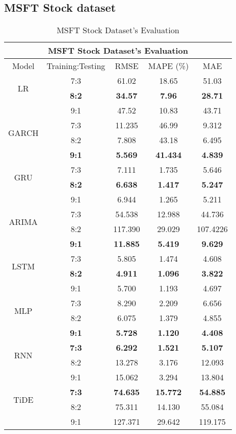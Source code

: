 \documentclass{ieeeojies}
\begin{document}
\subsection{MSFT Stock dataset} 
\begin{table}[H]
    \centering
    \begin{tabular}{|c|c|c|c|c|}
         \hline
         \multicolumn{5}{|c|}{\textbf{MSFT Stock Dataset's Evaluation}}\\
         \hline
         \centering Model & Training:Testing & RMSE & MAPE (\%) & MAE\\
         \hline
         \multirow{2}{*}{LR} & 7:3&61.02&18.65&51.03 
         \\ & \textbf{8:2} &  \textbf{34.57} & \textbf{7.96} & \textbf{28.71} 
         \\ & 9:1 & 47.52 & 10.83 & 43.71\\
       \hline
         \multirow{2}{*}{GARCH} & 7:3&11.235&46.99&9.312\\ & 8:2&7.808&43.18&6.495\\ & \textbf{9:1}& \textbf{5.569}& \textbf{41.434}& \textbf{4.839}\\
         \hline
         \multirow{2}{*}{GRU} & 7:3&7.111&1.735&5.646\\ &  \textbf{8:2}&\textbf{6.638}&\textbf{1.417}&	\textbf{5.247}\\ & 9:1& 6.944& 1.265& 5.211\\
         \hline
         \multirow{2}{*}{ARIMA} & 7:3 & 54.538 & 12.988 & 44.736 \\ & 8:2 & 117.390 & 29.029 & 107.4226 \\ & \textbf{9:1} & \textbf{11.885} & \textbf{5.419} & \textbf{9.629}\\
         \hline
         \multirow{2}{*}{LSTM} & 7:3 &5.805& 1.474& 4.608 \\ &\textbf{8:2} & \textbf{4.911} & \textbf{1.096} & \textbf{3.822} \\ &  9:1 &  5.700 &  1.193 &  4.697\\
         \hline
         \multirow{2}{*}{MLP} & 7:3 & 8.290 & 2.209 & 6.656 \\ & 8:2 & 6.075 & 1.379 & 4.855\\ & \textbf{9:1} & \textbf{5.728} & \textbf{1.120} & \textbf{4.408}\\
         \hline
         \multirow{2}{*}{RNN} & \textbf{7:3} &  \textbf{6.292} & \textbf{1.521} & \textbf{5.107} 
         \\ & 8:2 & 13.278 & 3.176 & 12.093
         \\ & 9:1 & 15.062 & 3.294 & 13.804 \\
         \hline
         \multirow{2}{*}{TiDE} & \textbf{7:3} & \textbf{74.635} &  \textbf{15.772} &  \textbf{54.885} 
         \\ & 8:2 & 75.311 &  14.130 &  55.084
         \\ & 9:1 & 127.371 & 29.642 & 119.175\\
         \hline
    \end{tabular}
    \caption{MSFT Stock Dataset's Evaluation}
    \label{mbbresult}
\end{table}
\end{document}
